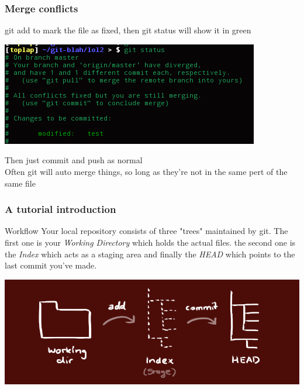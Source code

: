 \documentclass[xcolor=dvipsnames]{beamer}
\begin{document}
\begin{frame}
    \frametitle{Merge conflicts}

    git add to mark the file as fixed, then git status will show it in green

    \begin{center}
        \includegraphics[scale=0.4]{mergeconflict5.png}
    \end{center}

    Then just commit and push as normal\\
    Often git will auto merge things, so long as they're not in the same pert of the same file
\end{frame}
    
       

\begin{frame}
    \frametitle{A tutorial introduction}

    \begin{block}{Workflow}
        Your local repository consists of three "trees" maintained by git. The first one is 
        your \emph{Working Directory} which holds the actual files. the second one is the \emph{Index} which acts as a staging area and finally the \emph{HEAD} which points to the last commit you've made.
    \end{block}
    \begin{center}
        \includegraphics[scale=0.3]{trees.png}
    \end{center}
\end{frame}
\end{document}
